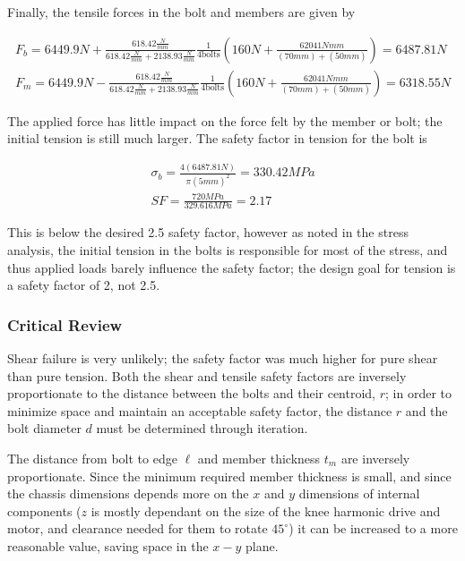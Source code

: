 Finally, the tensile forces in the bolt and members are given by

\begin{gather}
    F_b = 6449.9N + \frac{618.42\frac{N}{mm}}{618.42\frac{N}{mm} + 2138.93\frac{N}{mm}} \frac{1}{4\text{bolts}} \left( 160N + \frac{62041Nmm}{(70mm) + (50mm)} \right) = 6487.81N
    \\
    F_m = 6449.9N - \frac{618.42\frac{N}{mm}}{618.42\frac{N}{mm} + 2138.93\frac{N}{mm}} \frac{1}{4\text{bolts}} \left( 160N + \frac{62041Nmm}{(70mm) + (50mm)} \right) = 6318.55N
\end{gather}{}

The applied force has little impact on the force felt by the member or bolt; the initial tension is still much larger.
The safety factor in tension for the bolt is

\begin{gather}
    \sigma_b = \frac{4(6487.81N)}{\pi(5mm)^2} = 330.42MPa
    \\
    SF = \frac{720MPa}{329.616MPa} = 2.17
\end{gather}{}

This is below the desired 2.5 safety factor, however as noted in the stress analysis, the initial tension in the bolts is responsible for most of the stress, and thus applied loads barely influence the safety factor; the design goal for tension is a safety factor of 2, not 2.5.


\subsubsection{Critical Review}

Shear failure is very unlikely; the safety factor was much higher for pure shear than pure tension.
Both the shear and tensile safety factors are inversely proportionate to the distance between the bolts and their centroid, $r$; in order to minimize space and maintain an acceptable safety factor, the distance $r$ and the bolt diameter $d$ must be determined through iteration.

The distance from bolt to edge $\ell$ and member thickness $t_m$ are inversely proportionate.
Since the minimum required member thickness is small, and since the chassis dimensions depends more on the $x$ and $y$ dimensions of internal components ($z$ is mostly dependant on the size of the knee harmonic drive and motor, and clearance needed for them to rotate $45^{\circ}$) it can be increased to a more reasonable value, saving space in the $x-y$ plane.

